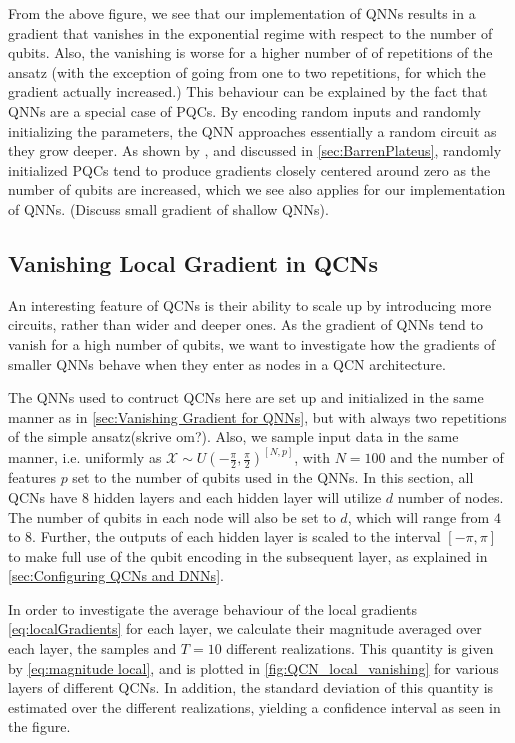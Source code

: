 From the above figure, we see that our implementation of QNNs results in a gradient that vanishes in the exponential regime with respect to the number of qubits. Also, the vanishing is worse for a higher number of of repetitions of the ansatz (with the exception of going from one to two repetitions, for which the gradient actually increased.) This behaviour can be explained by the fact that QNNs are a special case of PQCs. By encoding random inputs and randomly initializing the parameters, the QNN approaches essentially a random circuit as they grow deeper. As shown by \citet{McClean_2018}, and discussed in \autoref{sec:BarrenPlateus}, randomly initialized PQCs tend to produce gradients closely centered around zero as the number of qubits are increased, which we see also applies for our implementation of QNNs. (Discuss small gradient of shallow QNNs).    

\subsection{Vanishing Local Gradient in QCNs}\label{sec:Vanishing Local Gradients in QCNs}

An interesting feature of QCNs is their ability to scale up by introducing more circuits, rather than wider and deeper ones. As the gradient of QNNs tend to vanish for a high number of qubits, we want to investigate how the gradients of smaller QNNs behave when they enter as nodes in a QCN architecture. 

The QNNs used to contruct QCNs here are set up and initialized in the same manner as in \autoref{sec:Vanishing Gradient for QNNs}, but with always two repetitions of the simple ansatz(skrive om?). Also, we sample input data in the same manner, i.e. uniformly as $\mathcal{X} \sim U(-\frac{\pi}{2}, \frac{\pi}{2})^{[N,p]}$, with $N=100$ and the number of features $p$ set to the number of qubits used in the QNNs. In this section, all QCNs have 8 hidden layers and each hidden layer will utilize $d$ number of nodes. The number of qubits in each node will also be set to $d$, which will range from $4$ to $8$. Further, the outputs of each hidden layer is scaled to the interval $[-\pi, \pi]$ to make full use of the qubit encoding in the subsequent layer, as explained in \autoref{sec:Configuring QCNs and DNNs}.

In order to investigate the average behaviour of the local gradients \autoref{eq:localGradients} for each layer, we calculate their magnitude averaged over each layer, the samples and $T = 10$ different realizations. This quantity is given by \autoref{eq:magnitude local}, and is plotted in \autoref{fig:QCN_local_vanishing} for various layers of different QCNs. In addition, the standard deviation of this quantity is estimated over the different realizations, yielding a confidence interval as seen in the figure. 

